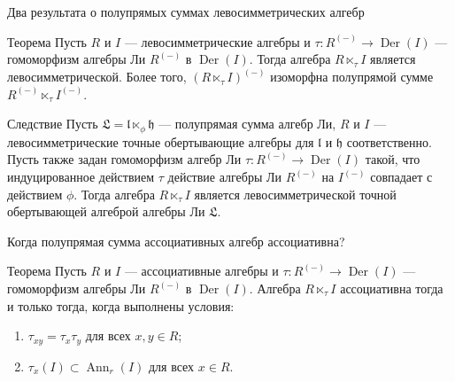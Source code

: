 \documentclass[12pt,aspectratio=169]{beamer}
\DeclareMathOperator{\Ann}{Ann}
\DeclareMathOperator{\Der}{Der}
\begin{document}
\begin{frame}[t]{Два результата о полупрямых суммах левосимметрических алгебр}
    \small
    \begin{block}{Теорема}
        Пусть $R$ и $I$ --- левосимметрические алгебры и $\tau\colon R^{(-)}\to\Der(I)$
        --- гомоморфизм алгебры Ли $R^{(-)}$ в $\Der(I)$. Тогда алгебра
        $R\ltimes_{\tau} I$ является левосимметрической. Более того, $(R\ltimes_{\tau}
        I)^{(-)}$ изоморфна полупрямой сумме $R^{(-)}\ltimes_\tau I^{(-)}$.
    \end{block}

    \begin{block}{Следствие}
        Пусть $\mathfrak{L} = \mathfrak{l}\ltimes_{\phi}\mathfrak{h}$ --- полупрямая
        сумма алгебр Ли, $R$ и $I$ --- левосимметрические точные обертывающие алгебры
        для $\mathfrak{l}$ и $\mathfrak{h}$ соответственно. Пусть также задан
        гомоморфизм алгебр Ли $\tau\colon R^{(-)}\to\Der(I)$ такой, что индуцированное
        действием $\tau$ действие алгебры Ли $R^{(-)}$ на $I^{(-)}$ совпадает с
        действием $\phi$. Тогда алгебра $R\ltimes_{\tau} I$ является левосимметрической
        точной обертывающей алгеброй алгебры Ли $\mathfrak{L}$.
    \end{block}
\end{frame}

\begin{frame}[t]{Когда полупрямая сумма ассоциативных алгебр ассоциативна?}
    \small
    \begin{block}{Теорема}
        Пусть $R$ и $I$ --- ассоциативные алгебры и $\tau\colon R^{(-)}\to\Der(I)$
        --- гомоморфизм алгебры Ли $R^{(-)}$ в $\Der(I)$. Алгебра
        $R\ltimes_{\tau} I$ ассоциативна тогда и только тогда, когда выполнены условия:
        \begin{enumerate}
            \item[\textup{(A)}] $\tau_{xy}=\tau_x\tau_y$ для всех $x,y\in R$;
            \item[\textup{(B)}] $\tau_x(I)\subset \Ann_r(I)$ для всех $x\in R$.
        \end{enumerate}
    \end{block}
\end{frame}
\end{document}

